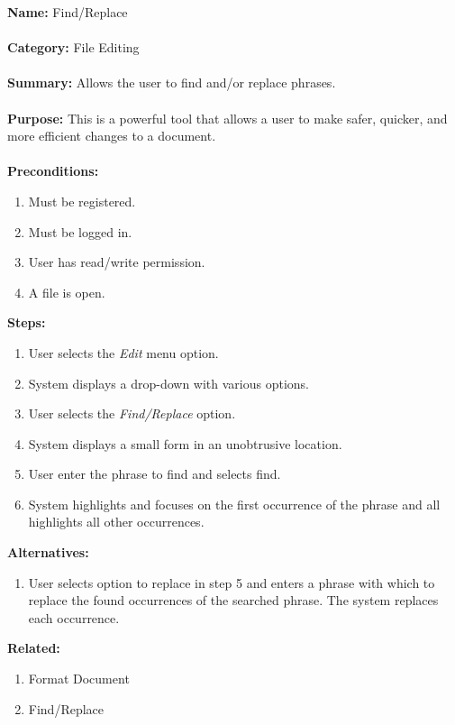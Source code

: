 \documentclass[14pt, a4paper]{article}
\begin{document}
\begin{framed}
	\noindent\textbf{Name:} Find/Replace \\ \\
	\textbf{Category:} File Editing \\ \\
	\textbf{Summary:} Allows the user to find and/or replace phrases. \\ \\
	\textbf{Purpose:} This is a powerful tool that allows a user to make safer, quicker, and more efficient changes to a document. \\ \\
	\textbf{Preconditions:} 
	\begin{enumerate}
		\item Must be registered.
		\item Must be logged in.
		\item User has read/write permission.
		\item A file is open.
	\end{enumerate}
	\textbf{Steps:}
	\begin{enumerate}
		\item User selects the \textit{Edit} menu option.
		\item System displays a drop-down with various options.
		\item User selects the \textit{Find/Replace} option.
		\item System displays a small form in an unobtrusive location.
		\item User enter the phrase to find and selects find.
		\item System highlights and focuses on the first occurrence of the phrase and all highlights all other occurrences.
	\end{enumerate}
	\textbf{Alternatives:}
	\begin{enumerate}
		\item User selects option to replace in step 5 and enters a phrase with which to replace the found occurrences of the searched phrase. The system replaces each occurrence.
	\end{enumerate}
	\textbf{Related:}
	\begin{enumerate}
		\item Format Document
		\item Find/Replace
	\end{enumerate}
\end{framed}

\newpage
\end{document}
